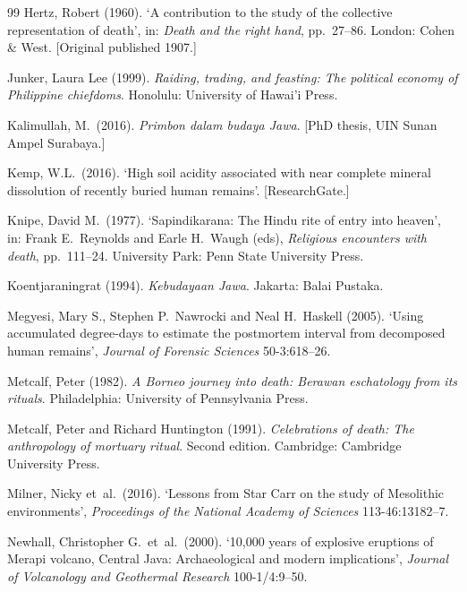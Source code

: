 \documentclass[12pt,a4paper]{article}
\begin{document}
\begin{thebibliography}{99}
Hertz, Robert (1960). `A contribution to the study of the collective representation of death', in: \textit{Death and the right hand}, pp.\ 27--86. London: Cohen \& West. [Original published 1907.]

Junker, Laura Lee (1999). \textit{Raiding, trading, and feasting: The political economy of Philippine chiefdoms}. Honolulu: University of Hawai'i Press.

Kalimullah, M.\ (2016). \textit{Primbon dalam budaya Jawa}. [PhD thesis, UIN Sunan Ampel Surabaya.]

Kemp, W.L.\ (2016). `High soil acidity associated with near complete mineral dissolution of recently buried human remains'. [ResearchGate.]

Knipe, David M.\ (1977). `Sapindikarana: The Hindu rite of entry into heaven', in: Frank E.\ Reynolds and Earle H.\ Waugh (eds), \textit{Religious encounters with death}, pp.\ 111--24. University Park: Penn State University Press.

Koentjaraningrat (1994). \textit{Kebudayaan Jawa}. Jakarta: Balai Pustaka.

Megyesi, Mary S., Stephen P.\ Nawrocki and Neal H.\ Haskell (2005). `Using accumulated degree-days to estimate the postmortem interval from decomposed human remains', \textit{Journal of Forensic Sciences} 50-3:618--26.

Metcalf, Peter (1982). \textit{A Borneo journey into death: Berawan eschatology from its rituals}. Philadelphia: University of Pennsylvania Press.

Metcalf, Peter and Richard Huntington (1991). \textit{Celebrations of death: The anthropology of mortuary ritual}. Second edition. Cambridge: Cambridge University Press.

Milner, Nicky et~al.\ (2016). `Lessons from Star Carr on the study of Mesolithic environments', \textit{Proceedings of the National Academy of Sciences} 113-46:13182--7.

Newhall, Christopher G.\ et~al.\ (2000). `10,000 years of explosive eruptions of Merapi volcano, Central Java: Archaeological and modern implications', \textit{Journal of Volcanology and Geothermal Research} 100-1/4:9--50.


\end{thebibliography}
\end{document}
